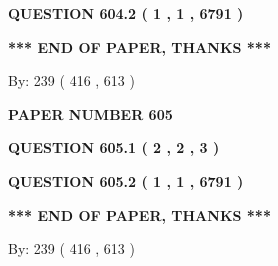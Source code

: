 \documentclass[12pt]{article}
\begin{document}
  
  
\vspace{0.2in}
  
{\textbf{\Large{QUESTION
604.2 
 ( 1 , 1 , 6791 )
}}}
  
  
   
   
 \vspace{0.2in}
 
   
   
   
   
\vspace{1.0in} 
{\textbf{\large{ *** END OF PAPER, THANKS *** }}} 
   
   
\hspace{1.0in} By: 
 239 ( 416 ,  613 )
   
   
   
   
\newpage 
\setcounter{page}{ 
   605001 } 
   
   
   
   
 {\textbf{ \Large{ PAPER NUMBER  605  }}}
   
   
\vspace{0.2in}
   
   
   
   
   
   
 \vspace{0.2in}
 
 
 
 
   
   
  
\vspace{0.2in}
  
{\textbf{\Large{QUESTION
605.1 
 ( 2 , 2 , 3 )
}}}
  
  
  
\vspace{0.2in}
  
{\textbf{\Large{QUESTION
605.2 
 ( 1 , 1 , 6791 )
}}}
  
  
   
   
 \vspace{0.2in}
 
   
   
   
   
\vspace{1.0in} 
{\textbf{\large{ *** END OF PAPER, THANKS *** }}} 
   
   
\hspace{1.0in} By: 
 239 ( 416 ,  613 )
   
   
   
\end{document}
